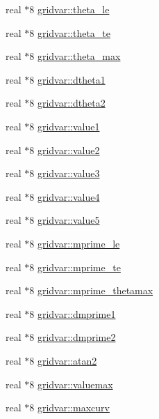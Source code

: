 \begin{DoxyCompactItemize}
\item 
real $\ast$8 \hyperlink{namespacegridvar_a2c69cc1685bd31d1e8722319a417957f}{gridvar\+::theta\+\_\+le}
\item 
real $\ast$8 \hyperlink{namespacegridvar_a60dbce3589b06c139cdf4d3ea77ba514}{gridvar\+::theta\+\_\+te}
\item 
real $\ast$8 \hyperlink{namespacegridvar_ac18957e46fd4763e6c2b1e08acc72714}{gridvar\+::theta\+\_\+max}
\item 
real $\ast$8 \hyperlink{namespacegridvar_ae90ed2e3a99be8961302612c1df8c598}{gridvar\+::dtheta1}
\item 
real $\ast$8 \hyperlink{namespacegridvar_ad0f5aa5081590596dff14679cc98c7b4}{gridvar\+::dtheta2}
\item 
real $\ast$8 \hyperlink{namespacegridvar_a58ea5ff8ac54ffb8b243dd41dc5f14af}{gridvar\+::value1}
\item 
real $\ast$8 \hyperlink{namespacegridvar_a65d2fa425cf459b253a54d267df8cad0}{gridvar\+::value2}
\item 
real $\ast$8 \hyperlink{namespacegridvar_a622406656271f2f246f84f97829821c2}{gridvar\+::value3}
\item 
real $\ast$8 \hyperlink{namespacegridvar_a2095a361bc90411a064b20d9ae56fed1}{gridvar\+::value4}
\item 
real $\ast$8 \hyperlink{namespacegridvar_a883f353750cac83a1357c0703986263d}{gridvar\+::value5}
\item 
real $\ast$8 \hyperlink{namespacegridvar_a109fb1faedc36b43ce61bd38477d6e89}{gridvar\+::mprime\+\_\+le}
\item 
real $\ast$8 \hyperlink{namespacegridvar_a5c94ce635053a47af93223354eb0df0c}{gridvar\+::mprime\+\_\+te}
\item 
real $\ast$8 \hyperlink{namespacegridvar_aa20ece35147167b59e43c622c6bc0216}{gridvar\+::mprime\+\_\+thetamax}
\item 
real $\ast$8 \hyperlink{namespacegridvar_a3baa2aa24a6ccc7d56e3a1fb2c053d2d}{gridvar\+::dmprime1}
\item 
real $\ast$8 \hyperlink{namespacegridvar_a4d01dbdf0f12e4c8dda949d59470ef8a}{gridvar\+::dmprime2}
\item 
real $\ast$8 \hyperlink{namespacegridvar_aaf7ab9a465673cc6de7235ca2790a0d8}{gridvar\+::atan2}
\item 
real $\ast$8 \hyperlink{namespacegridvar_a03c8e52b6729ce5c1acc022a80473142}{gridvar\+::valuemax}
\item 
real $\ast$8 \hyperlink{namespacegridvar_ae7488a3ae2a3eaff4a9e9ed253fb361e}{gridvar\+::maxcurv}

\end{DoxyCompactItemize}
